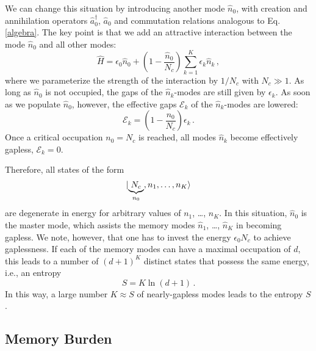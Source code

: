 \documentclass[aps,prd,reprint,superscriptaddress,nofootinbib]{revtex4-2}
\makeatletter
\newcommand*{\ie}{i.e., }
\newcommand*{\Eq}{Eq.\@\xspace}
\makeatother
\begin{document}
We can change this situation by introducing another mode $\hat{n}_0$, with creation and annihilation operators $\hat{a}_0^\dagger$, $\hat{a}_0$ and commutation relations analogous to \Eq \eqref{algebra}. The key point is that we add an attractive interaction between the mode $\hat{n}_0$ and all other modes:
\begin{equation}
	\hat{H} = \epsilon_0 \hat{n}_0 + \left(1-\frac{\hat{n}_0}{N_c}\right) \sum_{k =1}^K \epsilon_k \hat{n}_k \,,
\end{equation}
where we parameterize the strength of the interaction by $1/N_c$ with $N_c\gg 1$. As long as $\hat{n}_0$ is not occupied, the gaps of the $\hat{n}_k$-modes are still given by $\epsilon_k$. As soon as we populate $\hat{n}_0$, however, the effective gaps $\mathcal{E}_k$ of the $\hat{n}_k$-modes are lowered:
\begin{equation} \label{effectiveGap}
	 \mathcal{E}_k = \left(1-\frac{n_0}{N_c} \right)\epsilon_k \,.
\end{equation}
Once a critical occupation $n_0 = N_c$ is reached, all modes $\hat{n}_k$ become effectively gapless, 	$\mathcal{E}_k=0$. 

Therefore, all states of the form
\begin{equation}
	\ket{\underbrace{N_c}_{n_0}, n_1, \ldots, n_K}
	\label{Mpattern}
\end{equation}
are degenerate in energy for arbitrary values of $n_1$, \ldots, $n_K$. In 
this situation, $\hat{n}_0$ is the master mode, which assists the memory modes $\hat{n}_1$, \ldots, $\hat{n}_K$ in becoming gapless. We note, however, that one has to invest the energy $\epsilon_0 N_c$ to achieve gaplessness. If each of the memory modes can have a maximal occupation of $d$, this leads to a number of $(d+1)^K$ distinct states that possess the same 
energy, \ie an entropy
\begin{equation}
	S = K \ln (d+1) \,.
\end{equation}
In this way, a large number $K\approx S$ of nearly-gapless modes leads to 
the entropy $S$. 

\subsection{Memory Burden}
\label{ssec:memoryBurden}
\end{document}

